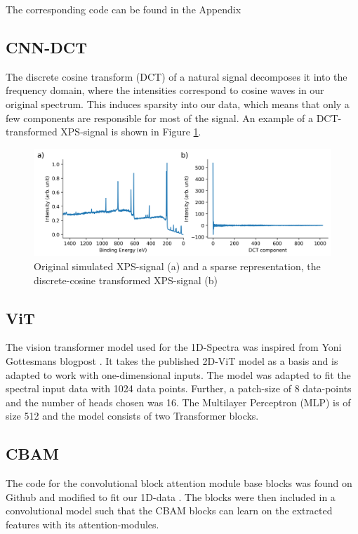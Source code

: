 
The corresponding code can be found in the Appendix 


\subsection{CNN-DCT}
The discrete cosine transform (DCT) of a natural signal decomposes it into the frequency domain, where the intensities correspond to cosine waves in our original spectrum. This induces sparsity into our data, which means that only a few components are responsible for most of the signal. An example of a DCT-transformed XPS-signal is shown in Figure \ref{fig:dct}.

\begin{figure}[H]
    \centering
    \includegraphics[width=\textwidth]{Figures/dct.png}
    \caption{Original simulated XPS-signal (a) and a sparse representation, the discrete-cosine transformed XPS-signal (b)}
    \label{fig:dct}
\end{figure}


\subsection{ViT}
The vision transformer model used for the 1D-Spectra was inspired from Yoni Gottesmans blogpost \cite{noauthor_interpretable_2023}. It takes the published 2D-ViT model  as a basis and is adapted to work with one-dimensional inputs.
The model was adapted to fit the spectral input data with 1024 data points. Further, a patch-size of 8 data-points and the number of heads chosen was 16.
The Multilayer Perceptron (MLP) is of size 512 and the model consists of two Transformer blocks.




\subsection{CBAM}
The code for the convolutional block attention module base blocks was found on Github and modified to fit our 1D-data \cite{mazzia__2023}.
The blocks were then included in a convolutional model such that the CBAM blocks can learn on the extracted features with its attention-modules.

